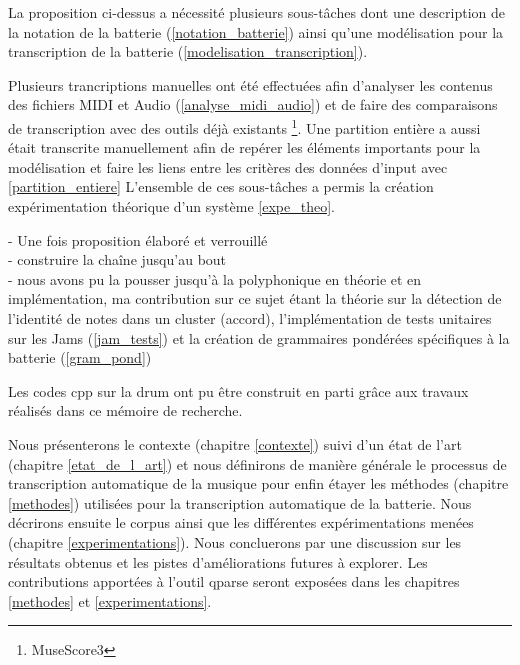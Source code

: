 
La proposition ci-dessus a nécessité plusieurs sous-tâches dont une description
de la notation de la batterie (\ref{notation_batterie}) ainsi qu’une
modélisation pour la transcription de la batterie
(\ref{modelisation_transcription}).

Plusieurs trancriptions manuelles ont été effectuées afin d’analyser les
contenus des fichiers MIDI et Audio (\ref{analyse_midi_audio}) et de faire des
comparaisons de transcription avec des outils déjà existants
\footnote{MuseScore3}. Une partition entière a aussi était transcrite
manuellement afin de repérer les éléments importants pour la modélisation et
faire les liens entre les critères des données d’input avec \ref{partition_entiere}
L’ensemble de ces sous-tâches a permis la création expérimentation théorique
d’un système \ref{expe_theo}.

- Une fois proposition élaboré et verrouillé\\
- construire la chaîne jusqu’au bout\\
- nous avons pu la pousser jusqu’à la polyphonique en théorie et en
implémentation, ma contribution sur ce sujet étant la théorie sur la détection
de l’identité de notes dans un cluster (accord), l’implémentation de tests
unitaires sur les Jams (\ref{jam_tests}) et la création de grammaires pondérées
spécifiques à la batterie (\ref{gram_pond})


Les codes cpp sur la drum ont pu être construit en parti grâce aux travaux
réalisés dans ce mémoire de recherche.

% 

Nous présenterons le contexte (chapitre \ref{contexte}) suivi d’un état de l’art
(chapitre \ref{etat_de_l_art}) et nous définirons de manière générale le
processus de transcription automatique de la musique pour enfin étayer les
méthodes (chapitre \ref{methodes}) utilisées pour la transcription automatique
de la batterie.  Nous décrirons ensuite le corpus ainsi que les différentes
expérimentations menées (chapitre \ref{experimentations}). Nous concluerons par
une discussion sur les résultats obtenus et les pistes d’améliorations futures
à explorer. Les contributions apportées à l’outil qparse seront exposées dans
les chapitres \ref{methodes} et \ref{experimentations}.
